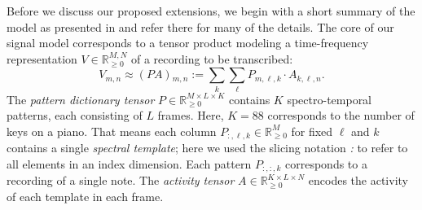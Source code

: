 \documentclass{article}
\def\R{{\mathbb R}}
\def\dict{{P}}
\def\act{{A}}
\def\spec{{V}}
\newcommand{\apspecvar}[1]{{\dict{#1}}}
\def\apspec{{\apspecvar{\act}}}
\newcommand{\ind}[1]{{_{#1}}}
\begin{document}
Before we discuss our proposed extensions, we begin with a short summary of the model as presented in \cite{EwertS16_PianoTranscriptionADMM_TASLP} and refer there for many of the details.
The core of our signal model corresponds to a tensor product modeling a time-frequency representation $V \in \R_{\ge 0}^{M,N}$ of a recording to be transcribed:
\begin{equation}
\spec\ind{m,n} \approx (\apspec)\ind{m,n} := \sum_k \sum_\ell \dict\ind{m,\ell,k} \cdot \act\ind{k,\ell,n}.
\label{eq:mainModel1}
\end{equation}
The \emph{pattern dictionary tensor} $\dict \in \R_{\ge 0}^{M \times L \times K}$ contains $K$ spectro-temporal patterns, each consisting of $L$ frames. Here, $K=88$ corresponds to the number of keys on a piano. That means each column $\dict\ind{:,\ell,k} \in \R_{\ge 0}^{M}$ for fixed $\ell$ and $k$ contains a single \emph{spectral template}; here we used the slicing notation \emph{:} to refer to all elements in an index dimension. Each pattern $\dict\ind{:,:,k}$ corresponds to a recording of a single note. 
The \emph{activity tensor} $\act \in \R_{\ge 0}^{K \times L \times N}$ encodes the activity of each template in each frame.
\end{document}

